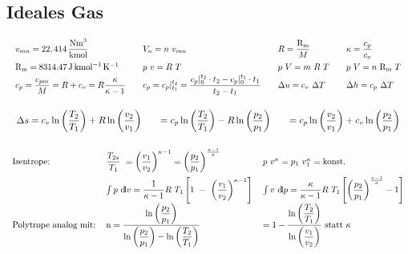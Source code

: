\subsection{Ideales Gas}
%
	\setlength{\abovedisplayskip}{-20pt}
		\[ \arraycolsep=1em  \def\arraystretch{1.5}
		\begin{array}{llll}
			v_{mn}=22,414\, \dfrac{\si{Nm^3}}{\si{\kmol}}          & V_n = n\ v_{mn}                                                                               & R=\dfrac{\mathrm{R_m}}{M}       & \kappa = \dfrac{c_p}{c_v} \\
			\mathrm{R_m} = \qty{8314,47}{\J\per\kmol\per\K}        & p\ v=R\ T                                                                                     & p\ V = m\ R\ T         & p\ V=n\ \mathrm{R_m}\ T            \\
			c_p=\dfrac{c_{pm}}{M}=R+c_v=R \dfrac{\kappa}{\kappa-1} & c_p=c_p|_{t_1}^{t_2}  =   \dfrac{c_p|_{0}^{t_2}\cdot t_2 - c_p|_{0}^{t_1}\cdot t_1}{t_2- t_1} & \Delta u=c_v\ \Delta T & \Delta h=c_p\ \Delta T
		\end{array} \]
%
	\setlength{\abovedisplayshortskip}{-14pt}
		\[ \arraycolsep=1em  \def\arraystretch{2.7}
		\begin{array}{lll}
	  \Delta s = c_v \ln\left( \dfrac{T_2}{T_1}\right) + R \ln\left( \dfrac{v_2}{v_1}\right)
			&  = c_p \ln\left( \dfrac{T_2}{T_1}\right) - R \ln\left( \dfrac{p_2}{p_1}\right)
			&  = c_p \ln\left( \dfrac{v_2}{v_1}\right) + c_v \ln\left( \dfrac{p_2}{p_1}\right)
		\end{array} \]

		\[ \arraycolsep=0.6em  \def\arraystretch{2.7}
		\begin{array}{lll}
			\text{Isentrope:}
			& \dfrac{T_{2s}}{T_1}\   =  \left(\dfrac{v_1}{v_2}\right)^{\kappa-1}  =
				\left(\dfrac{p_2}{p_1}\right)^\frac{\kappa-1}{\kappa}
			& p\ v^\kappa  =  p_1\ v_1^\kappa  =  \text{konst.}
		\\
			& \int p\ \dd v = \dfrac{1}{\kappa - 1}  R \ T_1
				\left[1\ -\ \left(\dfrac{v_1}{v_2}\right)^{\kappa-1}\right]
			& \int v\ \dd p = \dfrac{\kappa}{\kappa-1}  R \ T_1
				\left[\left(\dfrac{p_2}{p_1}\right)^\frac{\kappa-1}{\kappa}-1\right]
		\\
			\text{Polytrope analog mit:}
			&  \text{n} = \dfrac{
				\ln\left(\dfrac{p_2}{p_1}\right)} {
				\ln\left(\dfrac{p_2}{p_1}\right) -
				\ln\left(\dfrac{T_2}{T_1}\right)}
			&  = 1 - \dfrac{
				\ln\left(\dfrac{T_2}{T_1}\right)} {
				\ln\left(\dfrac{v_1}{v_2}\right)} \text{ statt } \kappa
		\end{array} \]

